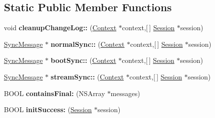 \subsection*{\-Static \-Public \-Member \-Functions}
\begin{DoxyCompactItemize}
\item 
\hypertarget{interface_sync_helper_a87a4d553d84a6af9a7ce1709656cc5ea}{
void {\bfseries cleanup\-Change\-Log\-::} (\hyperlink{interface_context}{\-Context} $\ast$context,\mbox{[}$\,$\mbox{]} \hyperlink{interface_session}{\-Session} $\ast$session)}
\label{interface_sync_helper_a87a4d553d84a6af9a7ce1709656cc5ea}

\item 
\hypertarget{interface_sync_helper_a3d5feaaf51a1e2f3c4284219b6e6f522}{
\hyperlink{interface_sync_message}{\-Sync\-Message} $\ast$ {\bfseries normal\-Sync\-::} (\hyperlink{interface_context}{\-Context} $\ast$context,\mbox{[}$\,$\mbox{]} \hyperlink{interface_session}{\-Session} $\ast$session)}
\label{interface_sync_helper_a3d5feaaf51a1e2f3c4284219b6e6f522}

\item 
\hypertarget{interface_sync_helper_a25614c8dc347b76f49d039c6577358eb}{
\hyperlink{interface_sync_message}{\-Sync\-Message} $\ast$ {\bfseries boot\-Sync\-::} (\hyperlink{interface_context}{\-Context} $\ast$context,\mbox{[}$\,$\mbox{]} \hyperlink{interface_session}{\-Session} $\ast$session)}
\label{interface_sync_helper_a25614c8dc347b76f49d039c6577358eb}

\item 
\hypertarget{interface_sync_helper_a296743c0ce82d3d03eadd32af6d9027e}{
\hyperlink{interface_sync_message}{\-Sync\-Message} $\ast$ {\bfseries stream\-Sync\-::} (\hyperlink{interface_context}{\-Context} $\ast$context,\mbox{[}$\,$\mbox{]} \hyperlink{interface_session}{\-Session} $\ast$session)}
\label{interface_sync_helper_a296743c0ce82d3d03eadd32af6d9027e}

\item 
\hypertarget{interface_sync_helper_a8d6011a5d33536808e7c1eddfbc66a0d}{
\-B\-O\-O\-L {\bfseries contains\-Final\-:} (\-N\-S\-Array $\ast$messages)}
\label{interface_sync_helper_a8d6011a5d33536808e7c1eddfbc66a0d}

\item 
\hypertarget{interface_sync_helper_a82eb407384a4e6fd80b763c9cc3bfc66}{
\-B\-O\-O\-L {\bfseries init\-Success\-:} (\hyperlink{interface_session}{\-Session} $\ast$session)}
\label{interface_sync_helper_a82eb407384a4e6fd80b763c9cc3bfc66}


\end{DoxyCompactItemize}

